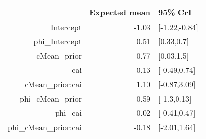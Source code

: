 \begin{tabular}{rrl}
  \hline
 & Expected mean & 95\% CrI \\ 
  \hline
Intercept & -1.03 & [-1.22,-0.84] \\ 
  phi\_Intercept & 0.51 & [0.33,0.7] \\ 
  cMean\_prior & 0.77 & [0.03,1.5] \\ 
  cai & 0.13 & [-0.49,0.74] \\ 
  cMean\_prior:cai & 1.10 & [-0.87,3.09] \\ 
  phi\_cMean\_prior & -0.59 & [-1.3,0.13] \\ 
  phi\_cai & 0.02 & [-0.41,0.47] \\ 
  phi\_cMean\_prior:cai & -0.18 & [-2.01,1.64] \\ 
   \hline
\end{tabular}

